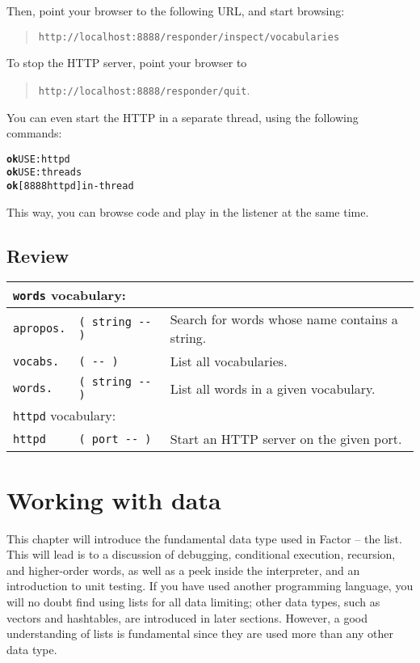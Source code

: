 \documentclass[english]{book}
\newcommand{\wordtable}[1]{{
\begin{tabularx}{12cm}{|l l X|}
#1
\hline
\end{tabularx}}}
\newcommand{\tabvocab}[1]{
\hline
\multicolumn{3}{|l|}{
\rule[-2mm]{0mm}{6mm}
\texttt{#1} vocabulary:}
\\
\hline
}
\begin{document}
Then, point your browser to the following URL, and start browsing:

\begin{quote}
\texttt{http://localhost:8888/responder/inspect/vocabularies}
\end{quote}

To stop the HTTP server, point your browser to

\begin{quote}
\texttt{http://localhost:8888/responder/quit}.
\end{quote}

You can even start the HTTP in a separate thread, using the following commands:

\begin{alltt}
\textbf{ok} USE: httpd
\textbf{ok} USE: threads
\textbf{ok} [ 8888 httpd ] in-thread
\end{alltt}

This way, you can browse code and play in the listener at the same time.

\section*{Review}

\wordtable{
\tabvocab{words}
\texttt{apropos.}&
\texttt{( string -{}- )}&
Search for words whose name contains a string.\\
\texttt{vocabs.}&
\texttt{( -{}- )}&
List all vocabularies.\\
\texttt{words.}&
\texttt{( string -{}- )}&
List all words in a given vocabulary.\\
\tabvocab{httpd}
\texttt{httpd}&
\texttt{( port -{}- )}&
Start an HTTP server on the given port.\\
}

\chapter{Working with data}

This chapter will introduce the fundamental data type used in Factor -- the list.
This will lead is to a discussion of debugging, conditional execution, recursion, and higher-order words, as well as a peek inside the interpreter, and an introduction to unit testing. If you have used another programming language, you will no doubt find using lists for all data limiting; other data types, such as vectors and hashtables, are introduced in later sections. However, a good understanding of lists is fundamental since they are used more than any other data type. 
\end{document}
